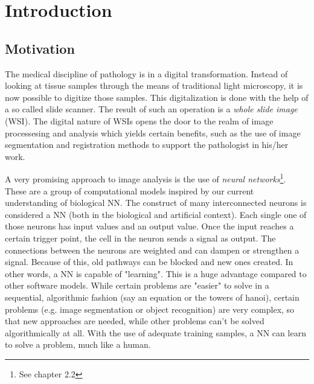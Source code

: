 \chapter{Introduction}

\section{Motivation}
The medical discipline of pathology is in a digital transformation. Instead of looking at tissue samples through the means of traditional light microscopy, it is now possible to digitize those samples. This digitalization is done with the help of a so called slide scanner. The result of such an operation is a \emph{whole slide image} (WSI)\cite{Cornish13}. The digital nature of WSIs opens the door to the realm of image processesing and analysis which yields certain benefits, such as the use of image segmentation and registration methods to support the pathologist in his/her work.

A very promising approach to image analysis is the use of \emph{neural networks}\footnote{See chapter 2.2}. These are a group of computational models inspired by our current understanding of biological NN. The construct of many interconnected neurons is considered a NN (both in the biological and artificial context). Each single one of those neurons has input values and an output value. Once the input reaches a certain trigger point, the cell in the neuron sends a signal as output. The connections between the neurons are weighted and can dampen or strengthen a signal. Because of this, old pathways can be blocked and new ones created. In other words, a NN is capable of "learning"\cite{Kriesel07}. This is a huge advantage compared to other software models. While certain problems are "easier" to solve in a sequential, algorithmic fashion (say an equation or the towers of hanoi), certain problems (e.g. image segmentation or object recognition) are very complex, so that new approaches are needed, while other problems can't be solved algorithmically at all. With the use of adequate training samples, a NN can learn to solve a problem, much like a human.

